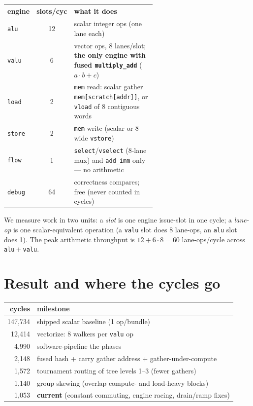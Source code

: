 \documentclass[11pt]{article}
\newcommand{\code}[1]{\texttt{#1}}
\begin{document}
\begin{center}
\begin{tabular}{lcp{0.60\linewidth}}
\toprule
engine & slots/cyc & what it does \\
\midrule
\code{alu}   & 12 & scalar integer ops (one lane each) \\
\code{valu}  & 6  & vector ops, 8 lanes/slot; \textbf{the only engine with fused \code{multiply\_add}} ($a\!\cdot\!b+c$) \\
\code{load}  & 2  & \code{mem} read: scalar gather \code{mem[scratch[addr]]}, or \code{vload} of 8 contiguous words \\
\code{store} & 2  & \code{mem} write (scalar or 8-wide \code{vstore}) \\
\code{flow}  & 1  & \code{select}/\code{vselect} (8-lane mux) and \code{add\_imm} only --- no arithmetic \\
\code{debug} & 64 & correctness compares; free (never counted in cycles) \\
\bottomrule
\end{tabular}
\end{center}

\noindent We measure work in two units: a \emph{slot} is one engine
issue-slot in one cycle; a \emph{lane-op} is one scalar-equivalent operation
(a \code{valu} slot does 8 lane-ops, an \code{alu} slot does 1). The peak
arithmetic throughput is $12 + 6\!\cdot\!8 = 60$ lane-ops/cycle across
\code{alu}${}+{}$\code{valu}.

\section{Result and where the cycles go}

\begin{center}
\begin{tabular}{rl}
\toprule
cycles & milestone \\
\midrule
147{,}734 & shipped scalar baseline (1 op/bundle) \\
12{,}414  & vectorize: 8 walkers per \code{valu} op \\
4{,}990   & software-pipeline the phases \\
2{,}148   & fused hash + carry gather address + gather-under-compute \\
1{,}572   & tournament routing of tree levels 1--3 (fewer gathers) \\
1{,}140   & group skewing (overlap compute- and load-heavy blocks) \\
1{,}053   & \textbf{current} (constant commuting, engine racing, drain/ramp fixes) \\
\bottomrule
\end{tabular}
\end{center}
\end{document}
